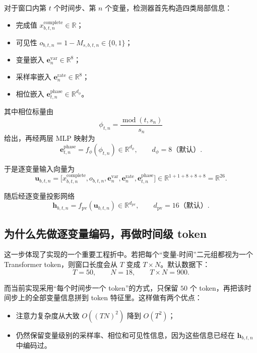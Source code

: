 \documentclass[UTF8]{ctexart}
\begin{document}
对于窗口内第 \(t\) 个时间步、第 \(n\) 个变量，检测器首先构造四类局部信息：
\begin{itemize}
    \item 完成值 \(x^{\text{complete}}_{b,t,n}\in\mathbb{R}\)；
    \item 可见性 \(o_{b,t,n} = 1 - M_{s,b,t,n}\in\{0,1\}\)；
    \item 变量嵌入 \(\bm{e}^{\text{var}}_n \in \mathbb{R}^{8}\)；
    \item 采样率嵌入 \(\bm{e}^{\text{rate}}_n \in \mathbb{R}^{8}\)；
    \item 相位嵌入 \(\bm{e}^{\text{phase}}_{t,n} \in \mathbb{R}^{d_{\phi}}\)。
\end{itemize}

其中相位标量由
\begin{equation}
    \phi_{t,n} = \frac{\operatorname{mod}(t,s_n)}{s_n}
\end{equation}
给出，再经两层 MLP 映射为
\begin{equation}
    \bm{e}^{\text{phase}}_{t,n}
    =
    f_{\phi}(\phi_{t,n}) \in \mathbb{R}^{d_{\phi}},
    \qquad d_{\phi}=8 \text{（默认）}.
\end{equation}

于是逐变量输入向量为
\begin{equation}
    \bm{u}_{b,t,n}
    =
    \Big[
        x^{\text{complete}}_{b,t,n},
        o_{b,t,n},
        \bm{e}^{\text{var}}_n,
        \bm{e}^{\text{rate}}_n,
        \bm{e}^{\text{phase}}_{t,n}
    \Big]
    \in \mathbb{R}^{1+1+8+8+8}
    =
    \mathbb{R}^{26}.
\end{equation}

随后经逐变量投影网络
\begin{equation}
    \bm{h}_{b,t,n} = f_{\text{pv}}(\bm{u}_{b,t,n}) \in \mathbb{R}^{d_{\text{pv}}},
    \qquad
    d_{\text{pv}} = 16 \text{（默认）}.
\end{equation}

\subsection{为什么先做逐变量编码，再做时间级 token}

这一步体现了实现的一个重要工程折中。若把每个“变量-时间”二元组都视为一个 Transformer token，则窗口长度会从 \(T\) 变成 \(T\times N\)。默认数据下：
\begin{equation}
    T = 50,\qquad N=18,\qquad T\times N = 900.
\end{equation}

而当前实现采用“每个时间步一个 token”的方式，只保留 \(50\) 个 token，再把该时间步上的全部变量信息拼到 token 特征里。这样做有两个优点：
\begin{itemize}
    \item 注意力复杂度从大致 \(O((TN)^2)\) 降到 \(O(T^2)\)；
    \item 仍然保留变量级别的采样率、相位和可见性信息，因为这些信息已经在 \(\bm{h}_{b,t,n}\) 中编码过。
\end{itemize}
\end{document}
